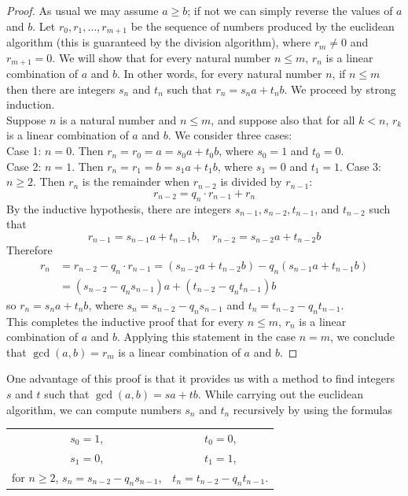 \documentclass{report}
\theoremstyle{definition}
\begin{document}
\begin{proof}
As usual we may assume $a\geq b$; if not we can simply reverse the values of $a$ and $b$. Let $r_0,r_1,\ldots,r_{m+1}$ be the sequence of numbers produced by the euclidean algorithm 
(this is guaranteed by the division algorithm), where 
$r_m\neq0$ and $r_{m+1}=0$. We will show that for every natural number $n\leq m$, $r_n$ is a linear
combination of $a$ and $b$. In other words, for every natural number $n$, if $n\leq m$ then there are integers $s_n$ and $t_n$ such that $r_n=s_na+t_nb$. We proceed by strong induction.\\
\indent Suppose $n$ is a natural number and $n\leq m$, and suppose also that for all $k<n$, $r_k$ is a linear combination of $a$ and $b$. We consider three cases:\\
\indent Case 1: $n=0$. Then $r_n=r_0=a=s_0a+t_0b$, where $s_0=1$ and $t_0=0$.\\
\indent Case 2: $n=1$. Then $r_n=r_1=b=s_1a+t_1b$, where $s_1=0$ and $t_1=1$.
\indent Case 3: $n\geq2$. Then $r_n$ is the remainder when $r_{n-2}$ is divided by $r_{n-1}$:
\begin{equation*}
r_{n-2}=q_n\cdot r_{n-1}+r_n
\end{equation*}
By the inductive hypothesis, there are integers $s_{n-1},s_{n-2},t_{n-1}$, and $t_{n-2}$ such that
\begin{equation*}
r_{n-1}=s_{n-1}a+t_{n-1}b,\quad r_{n-2}=s_{n-2}a+t_{n-2}b
\end{equation*}
Therefore
\begin{align*}
r_n&=r_{n-2}-q_n\cdot r_{n-1}=(s_{n-2}a+t_{n-2}b)-q_n(s_{n-1}a+t_{n-1}b)\\
&=(s_{n-2}-q_ns_{n-1})a+(t_{n-2}-q_nt_{n-1})b
\end{align*}
so $r_n=s_na+t_nb$, where $s_n=s_{n-2}-q_ns_{n-1}$ and $t_n=t_{n-2}-q_nt_{n-1}$.\\
\indent This completes the inductive proof that for every $n\leq m$, $r_n$ is a linear combination of $a$ and $b$. Applying this statement in the case $n=m$, we conclude that
$\gcd(a,b)=r_m$ is a linear combination of $a$ and $b$.
\end{proof}
\noindent One advantage of this proof is that it provides us with a method to find integers $s$ and $t$ such that $\gcd(a,b)=sa+tb$. While carrying out the euclidean
algorithm, we can compute numbers $s_n$ and $t_n$ recursively by using the formulas
\begin{center}
\begin{tabular}{cc}
$s_0=1$,&$t_0=0$,\\
$s_1=0$,&$t_1=1$,\\
for $n\geq2$, $s_n=s_{n-2}-q_ns_{n-1}$,&$t_n=t_{n-2}-q_nt_{n-1}$.
\end{tabular}
\end{center}
\end{document}
